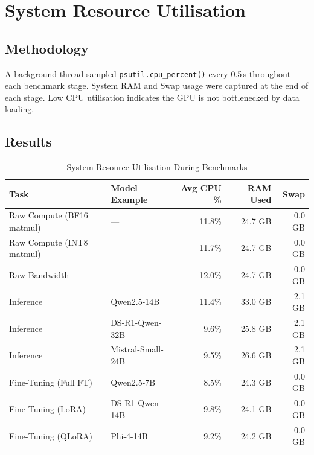 \documentclass[11pt,a4paper]{article}
\begin{document}
\section{System Resource Utilisation}

\subsection{Methodology}
A background thread sampled \texttt{psutil.cpu\_percent()} every 0.5\,s throughout
each benchmark stage. System RAM and Swap usage were captured at the end of each
stage. Low CPU utilisation indicates the GPU is not bottlenecked by data loading.

\subsection{Results}

\begin{table}[h!]
\centering
\caption{System Resource Utilisation During Benchmarks}
\label{tab:sysres}
\begin{tabular}{llrrr}
\toprule
\textbf{Task} & \textbf{Model Example} & \textbf{Avg CPU \%} & \textbf{RAM Used} & \textbf{Swap} \\
\midrule
Raw Compute (BF16 matmul) & ---              & 11.8\% & 24.7 GB & 0.0 GB \\
Raw Compute (INT8 matmul) & ---              & 11.7\% & 24.7 GB & 0.0 GB \\
Raw Bandwidth             & ---              & 12.0\% & 24.7 GB & 0.0 GB \\
\midrule
Inference                 & Qwen2.5-14B      &  11.4\% & 33.0 GB & 2.1 GB \\
Inference                 & DS-R1-Qwen-32B   &   9.6\% & 25.8 GB & 2.1 GB \\
Inference                 & Mistral-Small-24B &  9.5\% & 26.6 GB & 2.1 GB \\
\midrule
Fine-Tuning (Full FT)     & Qwen2.5-7B       &  8.5\% & 24.3 GB & 0.0 GB \\
Fine-Tuning (LoRA)        & DS-R1-Qwen-14B   &  9.8\% & 24.1 GB & 0.0 GB \\
Fine-Tuning (QLoRA)       & Phi-4-14B        &  9.2\% & 24.2 GB & 0.0 GB \\
\bottomrule
\end{tabular}
\end{table}
\end{document}
